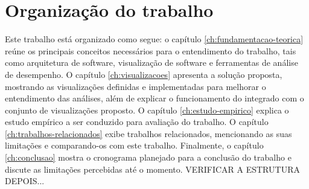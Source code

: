\section{Organização do trabalho} \label{sec:organizacao-trabalho}

Este trabalho está organizado como segue: o capítulo \ref{ch:fundamentacao-teorica} reúne os principais conceitos necessários para o entendimento do trabalho, tais como arquitetura de software, visualização de software e ferramentas de análise de desempenho. O capítulo \ref{ch:visualizacoes} apresenta a solução proposta, mostrando as visualizações definidas e implementadas para melhorar o entendimento das análises, além de explicar o funcionamento do \textit{\perfMinerName} integrado com o conjunto de visualizações proposto. O capítulo \ref{ch:estudo-empirico} explica o estudo empírico a ser conduzido para avaliação do trabalho. O capítulo \ref{ch:trabalhos-relacionados} exibe trabalhos relacionados, mencionando as suas limitações e comparando-os com este trabalho. Finalmente, o capítulo \ref{ch:conclusao} mostra o cronograma planejado para a conclusão do trabalho e discute as limitações percebidas até o momento. {\color{red} VERIFICAR A ESTRUTURA DEPOIS...}